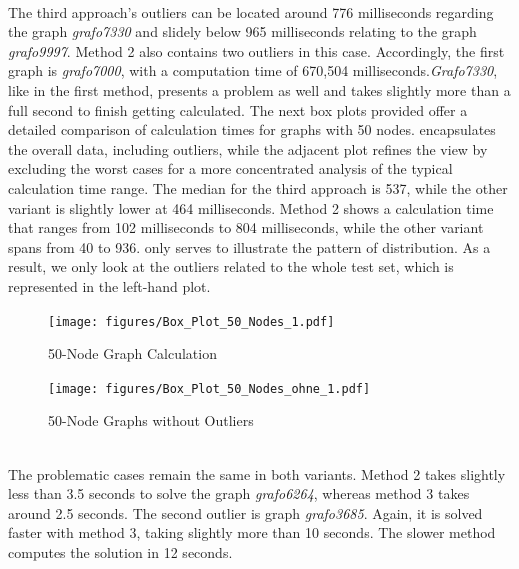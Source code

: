 \documentclass[bachelor, english]{algothesis}
\begin{document}
\\
The third approach's outliers can be located around 776 milliseconds regarding the graph \textit{grafo7330} and slidely below 965 milliseconds relating to the graph \textit{grafo9997}. Method 2 also contains two outliers in this case. Accordingly, the first graph is \textit{grafo7000}, with a computation time of 670,504 milliseconds.\textit{Grafo7330}, like in the first method, presents a problem as well and takes slightly more than a full second to finish getting calculated.
\newline
\newline
\noindent
The next box plots provided offer a detailed comparison of calculation times for graphs with 50 nodes.  encapsulates the overall data, including outliers, while the adjacent plot refines the view by excluding the worst cases for a more concentrated analysis of the typical calculation time range. The median for the third approach is 537, while the other variant is slightly lower at 464 milliseconds. Method 2 shows a calculation time that ranges from 102 milliseconds to 804 milliseconds, while the other variant spans from 40 to 936.  only serves to illustrate the pattern of distribution. As a result, we only look at the outliers related to the whole test set, which is represented in the left-hand plot.
\begin{figure}[ht]
  \centering
  \begin{minipage}{0.5\textwidth}
         \hspace{-1.8cm}
          \texttt{[image: figures/Box\_Plot\_50\_Nodes\_1.pdf]} 
  \caption{50-Node Graph Calculation}
  \label{fig:Calc_50_Nodes}
  \end{minipage}%
  \begin{minipage}{0.5\textwidth}
        \hspace{-0.3cm}
          \texttt{[image: figures/Box\_Plot\_50\_Nodes\_ohne\_1.pdf]} 
  \caption{50-Node Graphs without Outliers}
  \label{fig:Calc_50_Nodes_ohne}
  \end{minipage}
\end{figure}
\\
The problematic cases remain the same in both variants. Method 2 takes slightly less than 3.5 seconds to solve the graph \textit{grafo6264}, whereas method 3 takes around 2.5 seconds. The second outlier is graph \textit{grafo3685}. Again, it is solved faster with method 3, taking slightly more than 10 seconds. The slower method computes the solution in 12 seconds.
\end{document}
